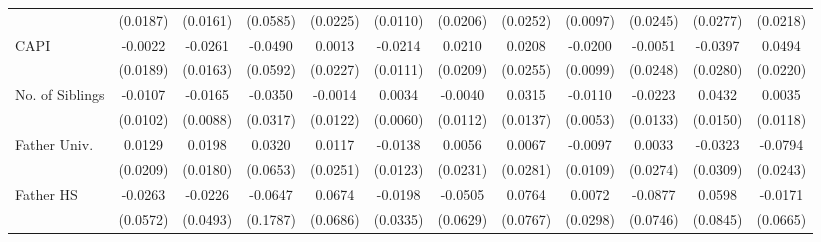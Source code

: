 \documentclass{article}
\begin{document}
\begin{table}[htbp]
\begin{tabular}{l*{11}{c}}
            &    (0.0187)         &    (0.0161)         &    (0.0585)         &    (0.0225)         &    (0.0110)         &    (0.0206)         &    (0.0252)         &    (0.0097)         &    (0.0245)         &    (0.0277)         &    (0.0218)         \\
\addlinespace
CAPI        &     -0.0022         &     -0.0261         &     -0.0490         &      0.0013         &     -0.0214         &      0.0210         &      0.0208         &     -0.0200\sym{*}  &     -0.0051         &     -0.0397         &      0.0494\sym{*}  \\
            &    (0.0189)         &    (0.0163)         &    (0.0592)         &    (0.0227)         &    (0.0111)         &    (0.0209)         &    (0.0255)         &    (0.0099)         &    (0.0248)         &    (0.0280)         &    (0.0220)         \\
\addlinespace
No. of Siblings&     -0.0107         &     -0.0165         &     -0.0350         &     -0.0014         &      0.0034         &     -0.0040         &      0.0315\sym{*}  &     -0.0110\sym{*}  &     -0.0223         &      0.0432\sym{**} &      0.0035         \\
            &    (0.0102)         &    (0.0088)         &    (0.0317)         &    (0.0122)         &    (0.0060)         &    (0.0112)         &    (0.0137)         &    (0.0053)         &    (0.0133)         &    (0.0150)         &    (0.0118)         \\
\addlinespace
Father Univ.&      0.0129         &      0.0198         &      0.0320         &      0.0117         &     -0.0138         &      0.0056         &      0.0067         &     -0.0097         &      0.0033         &     -0.0323         &     -0.0794\sym{**} \\
            &    (0.0209)         &    (0.0180)         &    (0.0653)         &    (0.0251)         &    (0.0123)         &    (0.0231)         &    (0.0281)         &    (0.0109)         &    (0.0274)         &    (0.0309)         &    (0.0243)         \\
\addlinespace
Father HS   &     -0.0263         &     -0.0226         &     -0.0647         &      0.0674         &     -0.0198         &     -0.0505         &      0.0764         &      0.0072         &     -0.0877         &      0.0598         &     -0.0171         \\
            &    (0.0572)         &    (0.0493)         &    (0.1787)         &    (0.0686)         &    (0.0335)         &    (0.0629)         &    (0.0767)         &    (0.0298)         &    (0.0746)         &    (0.0845)         &    (0.0665)         \\

\end{tabular}
\end{table}
\end{document}
